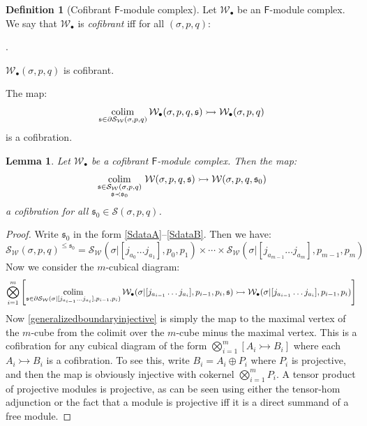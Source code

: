 \documentclass[12pt]{article}
\newtheorem{lemma}[theorem]{Lemma}
\theoremstyle{definition}
\newtheorem{definition}[theorem]{Definition}
\theoremstyle{remark}
\numberwithin{equation}{subsection}
\newcommand{\W}{\mathcal W}
\newcommand{\s}{\mathfrak s}
\newcommand{\SSS}{\mathcal S}
\newcommand{\colim}{\operatornamewithlimits{colim}}
\newcommand{\sF}{\mathsf{F}}
\newcounter{rcounti}
\newenvironment{rlist}{\begin{list}{\roman{rcounti}.}{\usecounter{rcounti}
\setlength\itemsep{0pt}
\setlength\labelsep{4pt}
\setlength\labelwidth{16pt}
\setlength\leftmargin{32pt}
\setlength\listparindent{0pt}
\setlength\parsep{0pt}
\setlength\parskip{0pt}
\setlength\partopsep{0pt}
\setlength\rightmargin{0pt}
\setlength\topsep{0pt}
\setlength\itemindent{0pt}
}}{\end{list}}
\begin{document}
\begin{definition}[Cofibrant $\sF$-module complex]\label{Fmodulecofibrantdef}
Let $\W_\bullet$ be an $\sF$-module complex.  We say that $\W_\bullet$ is \emph{cofibrant} iff for all $(\sigma,p,q)$:
\begin{rlist}
\item$\W_\bullet(\sigma,p,q)$ is cofibrant.
\item The map:
\begin{equation}\label{boundaryinjective}
\colim_{\s\in\partial\SSS_\W(\sigma,p,q)}\W_\bullet(\sigma,p,q,\s)\rightarrowtail\W_\bullet(\sigma,p,q)
\end{equation}
is a cofibration.
\end{rlist}
\end{definition}

\begin{lemma}\label{cofibrantinjectivelemma}
Let $\W_\bullet$ be a cofibrant $\sF$-module complex.  Then the map:
\begin{equation}\label{generalizedboundaryinjective}
\colim_{\begin{smallmatrix}\s\in\SSS_\W(\sigma,p,q)\cr\s\prec\s_0\end{smallmatrix}}\W(\sigma,p,q,\s)\rightarrowtail\W(\sigma,p,q,\s_0)
\end{equation}
a cofibration for all $\s_0\in\SSS(\sigma,p,q)$.
\end{lemma}

\begin{proof}
Write $\s_0$ in the form \eqref{SdataA}--\eqref{SdataB}.  Then we have:
\begin{equation}
\SSS_\W(\sigma,p,q)^{\leq\s_0}=\SSS_\W(\sigma|[j_{a_0}\ldots j_{a_1}],p_0,p_1)\times\cdots\times\SSS_\W(\sigma|[j_{a_{m-1}}\ldots j_{a_m}],p_{m-1},p_m)
\end{equation}
Now we consider the $m$-cubical diagram:
\begin{equation}
\bigotimes_{i=1}^m\left[\colim_{\s\in\partial\SSS_\W(\sigma|[j_{a_{i-1}}\ldots j_{a_i}],p_{i-1},p_i)}\W_\bullet(\sigma|[j_{a_{i-1}}\ldots j_{a_i}],p_{i-1},p_i,\s)\rightarrowtail\W_\bullet(\sigma|[j_{a_{i-1}}\ldots j_{a_i}],p_{i-1},p_i)\right]
\end{equation}
Now \eqref{generalizedboundaryinjective} is simply the map to the maximal vertex of the $m$-cube from the colimit over the $m$-cube minus the maximal vertex.  This is a cofibration for any cubical diagram of the form $\bigotimes_{i=1}^m[A_i\rightarrowtail B_i]$ where each $A_i\rightarrowtail B_i$ is a cofibration.  To see this, write $B_i=A_i\oplus P_i$ where $P_i$ is projective, and then the map is obviously injective with cokernel $\bigotimes_{i=1}^mP_i$.  A tensor product of projective modules is projective, as can be seen using either the tensor-hom adjunction or the fact that a module is projective iff it is a direct summand of a free module.
\end{proof}
\end{document}
